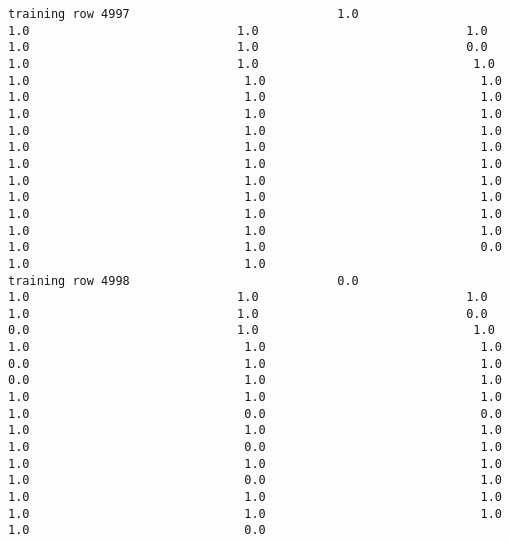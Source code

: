 \documentclass[11pt]{article}
\begin{document}
\begin{verbatim}
training row 4997                             1.0                             1.0                             1.0                             1.0                             1.0                             1.0                             0.0                             1.0                             1.0                              1.0                              1.0                              1.0                              1.0                              1.0                              1.0                              1.0                              1.0                              1.0                              1.0                              1.0                              1.0                              1.0                              1.0                              1.0                              1.0                              1.0                              1.0                              1.0                              1.0                              1.0                              1.0                              1.0                              1.0                              1.0                              1.0                              1.0                              1.0                              1.0                              1.0                              1.0                              1.0                              1.0                              0.0                              1.0                              1.0
training row 4998                             0.0                             1.0                             1.0                             1.0                             1.0                             1.0                             0.0                             0.0                             1.0                              1.0                              1.0                              1.0                              1.0                              0.0                              1.0                              1.0                              0.0                              1.0                              1.0                              1.0                              1.0                              1.0                              1.0                              0.0                              0.0                              1.0                              1.0                              1.0                              1.0                              0.0                              1.0                              1.0                              1.0                              1.0                              1.0                              0.0                              1.0                              1.0                              1.0                              1.0                              1.0                              1.0                              1.0                              1.0                              0.0

\end{verbatim}
\end{document}
